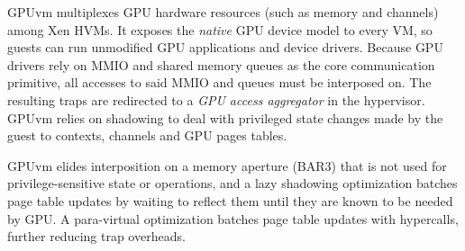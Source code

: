  \label{sec:gpuvm}
GPUvm multiplexes GPU hardware resources (such as memory and
channels) among Xen HVMs.
It exposes the \emph{native} GPU device model to every VM, so guests can run
unmodified GPU applications and device drivers. Because GPU drivers rely
on MMIO and shared memory queues as the core communication primitive,
all accesses to said MMIO and queues must be interposed on. The resulting traps are redirected to a \emph{GPU access aggregator} in the
hypervisor. GPUvm relies on shadowing to deal with privileged state changes made by the guest to contexts, channels and GPU pages tables.%

\label{sec_gpuvm_opt}
GPUvm elides interposition on a memory aperture (BAR3) that is not used for
privilege-sensitive state or operations, and a lazy shadowing optimization
batches page table updates by waiting to reflect them until they are known to
be needed by GPU. A para-virtual optimization batches page table updates with hypercalls, further reducing trap overheads.



